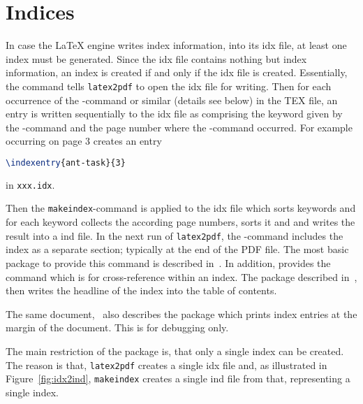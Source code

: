\section{Indices}\label{sec:indices}





In case the \LaTeX{} engine writes index information, 
into its \gls{idx} file, at least one index must be generated. 
Since the \gls{idx} file contains nothing but index information, 
an index is created if and only if the \gls{idx} file is created. 
Essentially, 
the command  tells \texttt{latex2pdf} 
to open the \gls{idx} file for writing. 
Then for each occurrence of the -command 
or similar (details see below) in the TEX file, 
an entry is written sequentially to the \gls{idx} file as 
 comprising the keyword given by the -command 
and the page number where the -command occurred. 
For example  occurring on page 3 creates an entry 
%
\begin{lstlisting}[language=TeX]
\indexentry{ant-task}{3}
\end{lstlisting}
%
in \texttt{xxx.idx}. 

Then the \texttt{makeindex}-command is applied to the \gls{idx} file 
which sorts keywords and for each keyword collects the according page numbers, 
sorts it and and writes the result into a \gls{ind} file. 
In the next run of \texttt{latex2pdf}, 
the -command includes the index as a separate section; 
typically at the end of the PDF file. 
The most basic package to provide this command 
is  described in~\cite{MkidxShIdxP}. 
In addition,  provides the command  
which is for cross-reference within an index. 
The package  described in~\cite{TocBibIndP}, 
then writes the headline of the index into the table of contents.

The same document,~\cite{MkidxShIdxP} 
also describes the package  
which prints index entries at the margin of the document. 
This is for debugging only. 
\medskip


The main restriction of the package  is, 
that only a single index can be created. 
The reason is that, \texttt{latex2pdf} creates a single \gls{idx} file 
and, as illustrated in Figure~\ref{fig:idx2ind}, 
\texttt{makeindex} creates a single ind file from that, 
representing a single index. 

